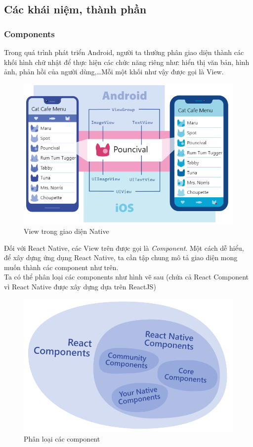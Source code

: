 \subsection{Các khái niệm, thành phần}
\subsubsection{Components}
Trong quá trình phát triển Android, người ta thường phân giao diện thành các khối hình chữ nhật để thực hiện các chức năng riêng như: hiển thị văn bản, hình ảnh, phản hồi của người dùng,\dots Mỗi một khối như vậy được gọi là View.
\begin{figure}[!ht]
    \centering
    \includegraphics[scale=0.5]{images/nativeViewComponent.png}
    \caption{View trong giao diện Native}
\end{figure}
Đối với React Native, các View trên được gọi là \textit{Component}. Một cách dễ hiểu, để xây dựng ứng dụng React Native, ta cần tập chung mô tả giao diện mong muốn thành các component như trên.\\
Ta có thể phân loại các components như hình vẽ sau (chứa cả React Component vì React Native được xây dựng dựa trên ReactJS)
\begin{figure}[!ht]
    \centering
    \includegraphics[scale=0.5]{images/reactComponents.png}
    \caption{Phân loại các component}
\end{figure}
